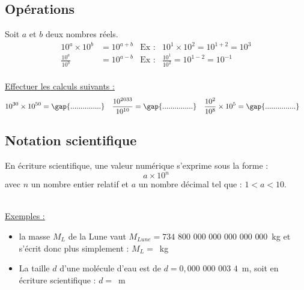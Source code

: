 \subsection{Opérations}
\begin{tcolorbox}[colback=red!5!white,colframe=red!75!black,title=\textbf{Règles de calculs des puissances de 10}]
Soit $a$ et $b$ deux nombres réels.
\begin{align*}
    10^{a}\times 10^b &= 10^{a+b} & \text{Ex :}& 10^{1}\times 10^2 = 10^{1+2}=10^3 \\
    \frac{10^{a}}{10^b} &= 10^{a-b} & \text{Ex :}& \frac{10^{1}}{10^2} = 10^{1-2}=10^{-1} \\
\end{align*}

\end{tcolorbox}
\underline{Effectuer les calculs suivants :}
\begin{align*}
    10^{30} \times 10^{50} &= \text{\gap{...............}} & \frac{10^{2033}}{10^{10}} &= \text{\gap{...............}} & \frac{10^2}{10^8}\times 10^5 &= \text{\gap{...............}}
\end{align*}
\subsection{Notation scientifique}

\begin{tcolorbox}[colback=green!5!white,colframe=green!75!black,title=\textbf{Ecriture scientifique d'un nombre}, upperbox=invisible]
En écriture scientifique, une valeur numérique s'exprime sous la forme :
\begin{equation*}
    a \times 10^n
\end{equation*}
avec $n$ un nombre entier relatif et $a$ un nombre décimal tel que : $1< a <10$.\\
\\
\end{tcolorbox}
\underline{Exemples :}
\begin{itemize}
    \item la masse $M_{L}$ de la Lune vaut $M_{Lune}=734$ $800$ $000$ $000$ $000$ $000$ $000$~kg et s'écrit donc plus simplement : $M_L=$~kg
    \item La taille $d$ d'une molécule d'eau est de  $d=0,000$ $000$ $003$ $4$~m, soit en écriture scientifique : $d=$~m
\end{itemize}

